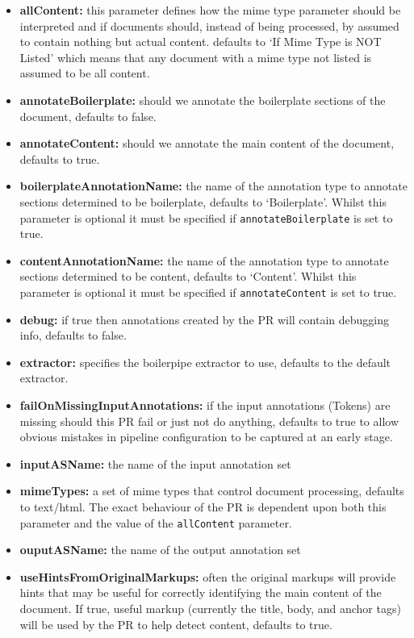 \begin{itemize}
\item \textbf{allContent:} this parameter defines how the mime type parameter should be interpreted and if documents should, instead of being processed, by assumed to contain nothing but actual content. defaults to `If Mime Type is NOT Listed' which means that any document with a mime type not listed is assumed to be all content.
\item \textbf{annotateBoilerplate:} should we annotate the boilerplate sections of the document, defaults to false.
\item \textbf{annotateContent:} should we annotate the main content of the document, defaults to true.
\item \textbf{boilerplateAnnotationName:} the name of the annotation type to annotate sections determined to be boilerplate, defaults to `Boilerplate'. Whilst this
  parameter is optional it must be specified if \texttt{annotateBoilerplate} is set to true.
\item \textbf{contentAnnotationName:} the name of the annotation type to annotate sections determined to be content, defaults to `Content'. Whilst this
  parameter is optional it must be specified if \texttt{annotateContent} is set to true.
\item \textbf{debug:} if true then annotations created by the PR will contain debugging info, defaults to false.
\item \textbf{extractor:} specifies the boilerpipe extractor to use, defaults to the default extractor.
\item \textbf{failOnMissingInputAnnotations:} if the input annotations (Tokens) are missing should this PR fail or just not do anything, defaults to true to allow
  obvious mistakes in pipeline configuration to be captured at an early stage.
\item \textbf{inputASName:} the name of the input annotation set
\item \textbf{mimeTypes:} a set of mime types that control document processing, defaults to text/html. The exact behaviour of the PR is dependent upon both this
  parameter and the value of the \texttt{allContent} parameter.
\item \textbf{ouputASName:} the name of the output annotation set
\item \textbf{useHintsFromOriginalMarkups:} often the original markups will provide hints that may be useful for correctly identifying the main content of the document.
  If true, useful markup (currently the title, body, and anchor tags) will be used by the PR to help detect content, defaults to true.
\end{itemize}

